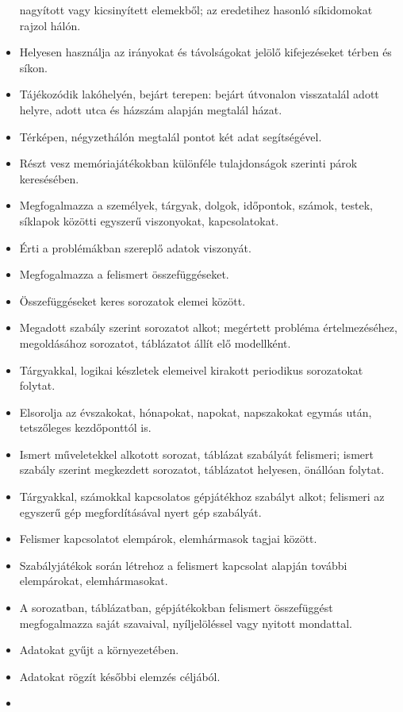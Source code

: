 \begin{itemize}
  nagyított vagy kicsinyített elemekből; az eredetihez hasonló
  síkidomokat rajzol hálón.
\item
  Helyesen használja az irányokat és távolságokat jelölő kifejezéseket
  térben és síkon.
\item
  Tájékozódik lakóhelyén, bejárt terepen: bejárt útvonalon visszatalál
  adott helyre, adott utca és házszám alapján megtalál házat.
\item
  Térképen, négyzethálón megtalál pontot két adat segítségével.
\item
  Részt vesz memóriajátékokban különféle tulajdonságok szerinti párok
  keresésében.
\item
  Megfogalmazza a személyek, tárgyak, dolgok, időpontok, számok, testek,
  síklapok közötti egyszerű viszonyokat, kapcsolatokat.
\item
  Érti a problémákban szereplő adatok viszonyát.
\item
  Megfogalmazza a felismert összefüggéseket.
\item
  Összefüggéseket keres sorozatok elemei között.
\item
  Megadott szabály szerint sorozatot alkot; megértett probléma
  értelmezéséhez, megoldásához sorozatot, táblázatot állít elő
  modellként.
\item
  Tárgyakkal, logikai készletek elemeivel kirakott periodikus
  sorozatokat folytat.
\item
  Elsorolja az évszakokat, hónapokat, napokat, napszakokat egymás után,
  tetszőleges kezdőponttól is.
\item
  Ismert műveletekkel alkotott sorozat, táblázat szabályát felismeri;
  ismert szabály szerint megkezdett sorozatot, táblázatot helyesen,
  önállóan folytat.
\item
  Tárgyakkal, számokkal kapcsolatos gépjátékhoz szabályt alkot;
  felismeri az egyszerű gép megfordításával nyert gép szabályát.
\item
  Felismer kapcsolatot elempárok, elemhármasok tagjai között.
\item
  Szabályjátékok során létrehoz a felismert kapcsolat alapján további
  elempárokat, elemhármasokat.
\item
  A sorozatban, táblázatban, gépjátékokban felismert összefüggést
  megfogalmazza saját szavaival, nyíljelöléssel vagy nyitott mondattal.
\item
  Adatokat gyűjt a környezetében.
\item
  Adatokat rögzít későbbi elemzés céljából.
\item

\end{itemize}
